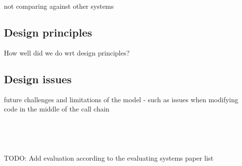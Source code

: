 \documentclass{sigchi}
\begin{document}
not comparing against other systems

\subsection{Design principles}
How well did we do wrt design principles?

\subsection{Design issues}
future challenges and limitations of the model - such as issues when modifying code
in the middle of the call chain

~

~

TODO: Add evaluation according to the evaluating systems paper list

\balance{}


\end{document}
